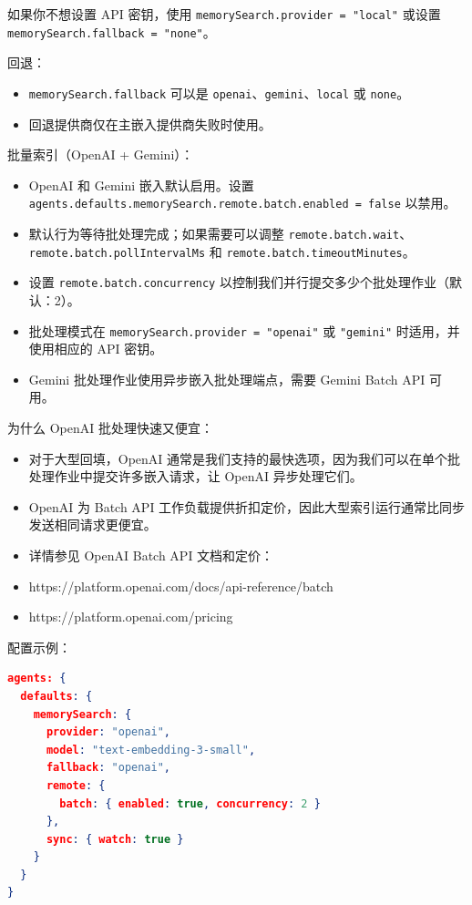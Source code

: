 如果你不想设置 API 密钥，使用 \texttt{memorySearch.provider = "local"} 或设置 \texttt{memorySearch.fallback = "none"}。

回退：

\begin{itemize}
  \item \texttt{memorySearch.fallback} 可以是 \texttt{openai}、\texttt{gemini}、\texttt{local} 或 \texttt{none}。
  \item 回退提供商仅在主嵌入提供商失败时使用。
\end{itemize}


批量索引（OpenAI + Gemini）：

\begin{itemize}
  \item OpenAI 和 Gemini 嵌入默认启用。设置 \texttt{agents.defaults.memorySearch.remote.batch.enabled = false} 以禁用。
  \item 默认行为等待批处理完成；如果需要可以调整 \texttt{remote.batch.wait}、\texttt{remote.batch.pollIntervalMs} 和 \texttt{remote.batch.timeoutMinutes}。
  \item 设置 \texttt{remote.batch.concurrency} 以控制我们并行提交多少个批处理作业（默认：2）。
  \item 批处理模式在 \texttt{memorySearch.provider = "openai"} 或 \texttt{"gemini"} 时适用，并使用相应的 API 密钥。
  \item Gemini 批处理作业使用异步嵌入批处理端点，需要 Gemini Batch API 可用。
\end{itemize}


为什么 OpenAI 批处理快速又便宜：

\begin{itemize}
  \item 对于大型回填，OpenAI 通常是我们支持的最快选项，因为我们可以在单个批处理作业中提交许多嵌入请求，让 OpenAI 异步处理它们。
  \item OpenAI 为 Batch API 工作负载提供折扣定价，因此大型索引运行通常比同步发送相同请求更便宜。
  \item 详情参见 OpenAI Batch API 文档和定价：
  \item https://platform.openai.com/docs/api-reference/batch
  \item https://platform.openai.com/pricing
\end{itemize}


配置示例：

\begin{lstlisting}[language=json]
agents: {
  defaults: {
    memorySearch: {
      provider: "openai",
      model: "text-embedding-3-small",
      fallback: "openai",
      remote: {
        batch: { enabled: true, concurrency: 2 }
      },
      sync: { watch: true }
    }
  }
}
\end{lstlisting}


